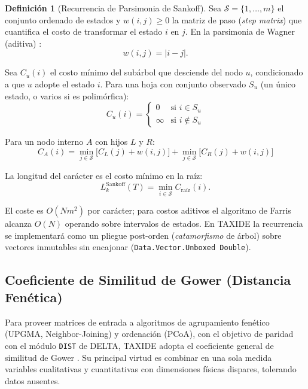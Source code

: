 \documentclass[11pt,a4paper]{article}
\theoremstyle{definition}
\newtheorem{definicion}{Definición}[section]
\theoremstyle{remark}
\begin{document}
\begin{definicion}[Recurrencia de Parsimonia de Sankoff]
Sea $\mathcal{S} = \{1, \dots, m\}$ el conjunto ordenado de estados y $w(i, j) \ge 0$ la matriz de paso (\textit{step matrix}) que cuantifica el costo de transformar el estado $i$ en $j$. En la parsimonia de Wagner (aditiva) \cite{farris1970}:
\begin{equation}
w(i, j) = |i - j|.
\end{equation}

Sea $C_u(i)$ el costo mínimo del subárbol que desciende del nodo $u$, condicionado a que $u$ adopte el estado $i$. Para una hoja con conjunto observado $S_u$ (un único estado, o varios si es polimórfica):
\begin{equation}
C_u(i) = \begin{cases}
0 & \text{si } i \in S_u \\
\infty & \text{si } i \notin S_u
\end{cases}
\end{equation}

Para un nodo interno $A$ con hijos $L$ y $R$:
\begin{equation}
\label{eq:sankoff}
C_A(i) = \min_{j \in \mathcal{S}} \Big[ C_L(j) + w(i, j) \Big] + \min_{j \in \mathcal{S}} \Big[ C_R(j) + w(i, j) \Big]
\end{equation}
\end{definicion}

La longitud del carácter es el costo mínimo en la raíz:
\begin{equation}
L_k^{\text{Sankoff}}(T) = \min_{i \in \mathcal{S}} C_{\text{raíz}}(i).
\end{equation}

El coste es $O(N m^2)$ por carácter; para costos aditivos el algoritmo de Farris \cite{farris1970} alcanza $O(N)$ operando sobre intervalos de estados. En TAXIDE la recurrencia se implementará como un pliegue post-orden (\textit{catamorfismo} de árbol) sobre vectores inmutables sin encajonar (\texttt{Data.Vector.Unboxed Double}).

\subsection{Coeficiente de Similitud de Gower (Distancia Fenética)}
\label{sec:gower}
Para proveer matrices de entrada a algoritmos de agrupamiento fenético (UPGMA, Neighbor-Joining) y ordenación (PCoA), con el objetivo de paridad con el módulo \texttt{DIST} de DELTA, TAXIDE adopta el coeficiente general de similitud de Gower \cite{gower1971}. Su principal virtud es combinar en una sola medida variables cualitativas y cuantitativas con dimensiones físicas dispares, tolerando datos ausentes.
\end{document}
